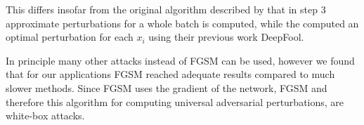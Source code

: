 This differs insofar from the original algorithm described by \citet{universal} that in step 3 approximate perturbations for a whole batch is computed, while the computed an optimal perturbation for each $x_i$ using their previous work DeepFool.

In principle many other attacks instead of FGSM can be used, however we found that for our applications FGSM reached adequate results compared to much slower methods.
Since FGSM uses the gradient of the network, FGSM and therefore this algorithm for computing universal adversarial perturbations, are white-box attacks.
